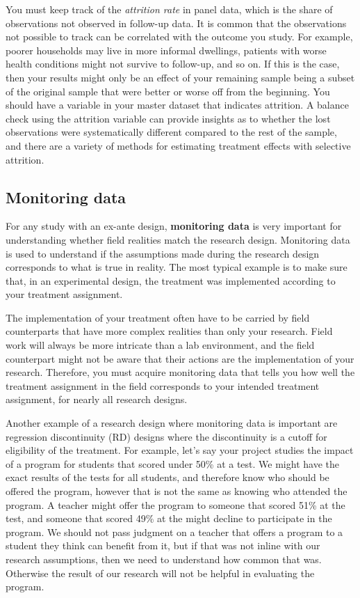 You must keep track of the \textit{attrition rate} in panel data,
which is the share of observations not observed in follow-up data.
It is common that the observations not possible to track
can be correlated with the outcome you study.
For example, poorer households may live in more informal dwellings,
patients with worse health conditions might not survive to follow-up,
and so on.
If this is the case, then your results might only be an effect of your remaining sample
being a subset of the original sample that were better or worse off from the beginning.
You should have a variable in your master dataset that indicates attrition.
A balance check using the attrition variable can provide insights
as to whether the lost observations were systematically different
compared to the rest of the sample,
and there are a variety of methods for estimating treatment effects
with selective attrition.

\subsection{Monitoring data}

For any study with an ex-ante design, 
\textbf{monitoring data}
is very important for understanding whether field realities match the research design.
Monitoring data is used to understand if the
assumptions made during the research design corresponds to what is true in reality.
The most typical example is to make sure that, in an experimental design,
the treatment was implemented according to your treatment assignment.

The implementation of your treatment often have to be carried by field counterparts
that have more complex realities than only your research.
Field work will always be more intricate than a lab environment, 
and the field counterpart might not be aware that their actions are the implementation of your research.
Therefore, you must acquire monitoring data that tells you how well the treatment assignment in the field
corresponds to your intended treatment assignment,
for nearly all research designs.

Another example of a research design where monitoring data is important
are regression discontinuity (RD) designs
where the discontinuity is a cutoff for eligibility of the treatment. 
For example, 
let's say your project studies the impact of a program for students that scored under 50\% at a test.
We might have the exact results of the tests for all students, 
and therefore know who should be offered the program, 
however that is not the same as knowing who attended the program. 
A teacher might offer the program to someone that scored 51\% at the test,
and someone that scored 49\% at the might decline to participate in the program.
We should not pass judgment on a teacher that offers a program to a student
they think can benefit from it, 
but if that was not inline with our research assumptions,
then we need to understand how common that was.
Otherwise the result of our research will not be helpful
in evaluating the program.

